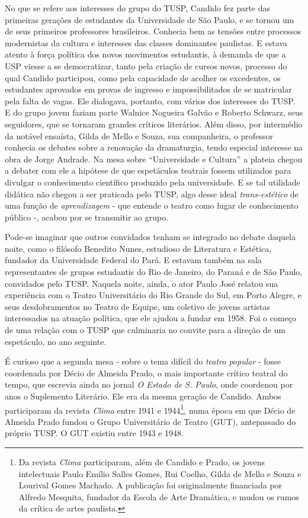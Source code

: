 No que se refere aos interesses do grupo do TUSP, Candido fez parte das
primeiras gerações de estudantes da Universidade de São Paulo, e se
tornou um de seus primeiros professores brasileiros. Conhecia bem as
tensões entre processos modernistas da cultura e interesses das classes
dominantes paulistas. E estava atento à força política dos novos
movimentos estudantis, à demanda de que a USP viesse a se democratizar,
tanto pela criação de cursos novos, processo do qual Candido participou,
como pela capacidade de acolher os excedentes, os estudantes aprovados
em provas de ingresso e impossibilitados de se matricular pela falta de
vagas. Ele dialogava, portanto, com vários dos interesses do TUSP. E do
grupo jovem faziam parte Walnice Nogueira Galvão e Roberto Schwarz, seus
seguidores, que se tornaram grandes críticos literários. Além disso, por
intermédio da notável ensaísta, Gilda de Mello e Souza, sua companheira,
o professor conhecia os debates sobre a renovação da dramaturgia, tendo
especial interesse na obra de Jorge Andrade. Na mesa sobre “Universidade
e Cultura” a plateia chegou a debater com ele a hipótese de que
espetáculos teatrais fossem utilizados para divulgar o conhecimento
científico produzido pela universidade. E se tal utilidade didática não
chegou a ser praticada pelo TUSP, algo desse ideal \textit{trans-estético}
de uma função de \textit{aprendizagem} - que entende o teatro como lugar de
conhecimento público -, acabou por se transmitir ao grupo.

Pode-se imaginar que outros convidados tenham se integrado no debate
daquela noite, como o filósofo Benedito Nunes, estudioso de Literatura e
Estética, fundador da Universidade Federal do Pará. E estavam também na
sala representantes de grupos estudantis do Rio de Janeiro, do Paraná e
de São Paulo, convidados pelo TUSP. Naquela noite, ainda, o ator Paulo
José relatou sua experiência com o Teatro Universitário do Rio Grande do
Sul, em Porto Alegre, e seus desdobramentos no Teatro de Equipe, um
coletivo de jovens artistas interessados na atuação política, que ele
ajudou a fundar em 1958. Foi o começo de uma relação com o TUSP que
culminaria no convite para a direção de um espetáculo, no ano seguinte.

É curioso que a segunda mesa - sobre o tema difícil do \textit{teatro
popular} - fosse coordenada por Décio de Almeida Prado, o mais
importante crítico teatral do tempo, que escrevia ainda no jornal \textit{O
Estado de S. Paulo}, onde coordenou por anos o Suplemento Literário. Ele
era da mesma geração de Candido. Ambos participaram da revista
\textit{Clima} entre 1941 e 1944\footnote{Da revista \textit{Clima}
  participaram, além de Candido e Prado, os jovens intelectuais Paulo
  Emílio Salles Gomes, Rui Coelho, Gilda de Mello e Souza e Lourival
  Gomes Machado. A publicação foi originalmente financiada por Alfredo
  Mesquita, fundador da Escola de Arte Dramática, e mudou os rumos da
  crítica de artes paulista.}, numa época em que Décio de Almeida Prado
fundou o Grupo Universitário de Teatro (GUT), antepassado do próprio
TUSP. O GUT existiu entre 1943 e 1948.

